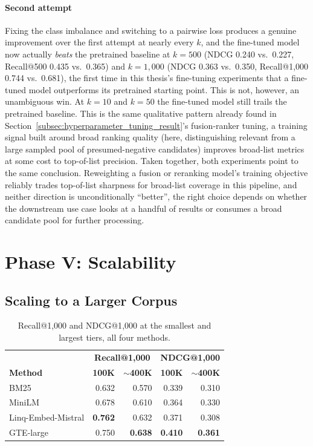 \documentclass[a4paper,oneside,bibliography=totoc]{scrbook}
\begin{document}
\paragraph{Second attempt} Fixing the class imbalance and switching to a pairwise loss produces a genuine improvement over the first attempt at nearly every $k$, and the fine-tuned model now actually \emph{beats} the pretrained baseline at $k=500$ (NDCG 0.240 vs.\ 0.227, Recall@500 0.435 vs.\ 0.365) and $k=1{,}000$ (NDCG 0.363 vs.\ 0.350, Recall@1{,}000 0.744 vs.\ 0.681), the first time in this thesis's fine-tuning experiments that a fine-tuned model outperforms its pretrained starting point. This is not, however, an unambiguous win. At $k=10$ and $k=50$ the fine-tuned model still trails the pretrained baseline. This is the same qualitative pattern already found in Section~\ref{subsec:hyperparameter_tuning_result}'s fusion-ranker tuning, a training signal built around broad ranking quality (here, distinguishing relevant from a large sampled pool of presumed-negative candidates) improves broad-list metrics at some cost to top-of-list precision. Taken together, both experiments point to the same conclusion. Reweighting a fusion or reranking model's training objective reliably trades top-of-list sharpness for broad-list coverage in this pipeline, and neither direction is unconditionally ``better'', the right choice depends on whether the downstream use case looks at a handful of results or consumes a broad candidate pool for further processing.

\section{Phase V: Scalability}
\label{sec:phase5_result}

\subsection{Scaling to a Larger Corpus}
\label{sec:scaling_corpus_result}

\begin{table}[ht]
\centering
\caption{Recall@1{,}000 and NDCG@1{,}000 at the smallest and largest tiers, all four methods.}
\label{tab:scaling_eval}
\begin{tabular}{lrrrr}
\toprule
& \multicolumn{2}{c}{\textbf{Recall@1{,}000}} & \multicolumn{2}{c}{\textbf{NDCG@1{,}000}} \\
\textbf{Method} & \textbf{100K} & \textbf{$\sim$400K} & \textbf{100K} & \textbf{$\sim$400K} \\
\midrule
BM25       & 0.632 & 0.570 & 0.339 & 0.310 \\
MiniLM     & 0.678 & 0.610 & 0.364 & 0.330 \\
Linq-Embed-Mistral & \textbf{0.762} & 0.632 & 0.371 & 0.308 \\
GTE-large  & 0.750 & \textbf{0.638} & \textbf{0.410} & \textbf{0.361} \\
\bottomrule
\end{tabular}
\end{table}
\end{document}
